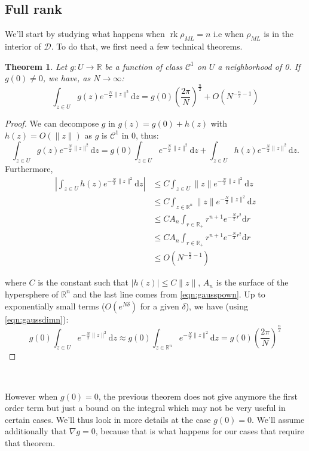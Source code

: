 \documentclass[10pt,a4paper]{report}
\theoremstyle{plain}
\newtheorem{thm}{Theorem}[chapter]
\theoremstyle{definition}
\theoremstyle{remark}
\newcommand{\R}{\ensuremath{\mathbb{R}}}
\newcommand{\dd}{\mathrm{d}}
\renewcommand{\leq}{\leqslant}
\DeclareMathOperator{\rk}{rk}
\newcommand{\class}[1]{{\mathscr{C}^{#1}}}
\newcommand{\ml}{_{M\!L}}
\begin{document}
\subsection{Full rank}

We'll start by studying what happens when $\rk \rho\ml = n$ i.e when $\rho\ml$
is in the interior of $\mathcal{D}$. To do that, we first need a few technical theorems.

\begin{thm}\label{thm:asy1}
  Let $g : U \to \R$ be a function of class $\class 1$ on $U$ a neighborhood of 0. If $g(0)
  \neq 0$, we have, as $N \to \infty$:
  \[\int_{z \in U} g(z)e^{-\frac N2\|z\|^2} \dd z = g(0){\left(\frac
      {2\pi}{N}\right)}^{\frac n 2} +
    O\left({N^{-\frac n 2 -1}}\right)\]
\end{thm}

\begin{proof}
  We can decompose $g$ in $g(z) = g(0) + h(z)$ with $h(z) = O(\|z\|)$ as $g$ is
  $\class{1}$ in 0, thus:
\[\int_{z \in U} g(z)e^{-\frac N2\|z\|^2} \dd z = g(0)\int_{z \in U} e^{-\frac
    N2\|z\|^2} \dd z + \int_{z \in U} h(z)e^{-\frac N2\|z\|^2} \dd z.\]
Furthermore,
\begin{align*}
  \left |\int_{z \in U} h(z)e^{-\frac N2\|z\|^2} \dd z\right|
  &\leq C \int_{z \in U} \|z\|e^{-\frac N2\|z\|^2} \dd z\\
  &\leq C \int_{z \in \R^n} \|z\|e^{-\frac N2\|z\|^2} \dd z\\
  &\leq CA_n \int_{r \in \R_+} r^{n+1}e^{-\frac N2 r^2} \dd r\\
  &\leq CA_n \int_{r \in \R_+} r^{n+1}e^{-\frac N2 r^2} \dd r\\
  &\leq O\left({N^{-\frac n 2 -1}}\right)
\end{align*}

where $C$ is the constant such that $|h(z)| \leq C \|z\|$, $A_n$ is the surface
of the hypersphere of $\R^n$ and the last line comes from \cref{eqn:gausspown}.
Up to exponentially small terms ($O(e^{N\delta})$ for a given $\delta$), we have
(using \cref{eqn:gaussdimn}):
\[g(0)\int_{z \in U} e^{-\frac
    N2\|z\|^2} \dd z \approx g(0)\int_{z \in \R^n} e^{-\frac
    N2\|z\|^2} \dd z = g(0) {\left(\frac
      {2\pi}{N}\right)}^{\frac n 2}\]

\end{proof}

\


However when $g(0) = 0$, the previous theorem does not give anymore the first
order term but just a bound on the integral which may not be very useful in
certain cases. We'll thus look in more details at the case $g(0) = 0$. We'll
assume additionally that $\nabla g = 0$, because that is what happens for our
cases that require that theorem.
\end{document}
